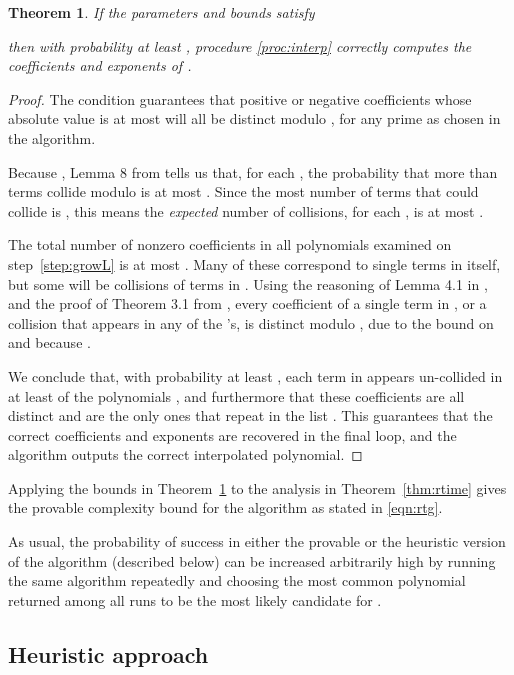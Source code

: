 \documentclass[letterpaper,10pt]{article}
\def\cite{\citep}
\newtheorem{theorem}{Theorem}
\begin{document}
\begin{theorem}\label{thm:bounds}
  If the parameters  and bounds  satisfy 
  
  then with
  probability at least , procedure \ref{proc:interp} correctly
  computes the coefficients and exponents of .
\end{theorem}
\begin{proof}
  The condition  guarantees that positive or negative
  coefficients whose absolute value is at most  will all be distinct
  modulo , for any prime  as chosen in the algorithm.

  Because , Lemma 8 from \cite{AGR13}
  tells us that, for each , the probability that more than 
  terms collide modulo  is at most .
  Since the most number of terms that could collide is , this means
  the \emph{expected} number of collisions, for each , is at
  most .

  The total number of nonzero coefficients in all polynomials  examined on
  step~\ref{step:growL} is at most . Many of
  these correspond to single terms in  itself, but some will be
  collisions of terms in . Using the reasoning of Lemma 4.1 in
  \cite{AGR14}, and the proof of Theorem 3.1 from \cite{GR11a},
  every coefficient of a single term in , or a collision that appears
  in any of the 's, is distinct modulo , due to the bound on
   and because .

  We conclude that, with probability at least , each term in 
  appears un-collided in at least  of the polynomials , and
  furthermore that these coefficients are all distinct and are the only
  ones that repeat in the list . This guarantees that the correct
  coefficients and exponents are recovered in the final loop, and the
  algorithm outputs the correct interpolated polynomial.
\end{proof}

Applying the bounds in Theorem~\ref{thm:bounds} to the analysis in
Theorem~\ref{thm:rtime} gives the provable complexity bound for the
algorithm as stated in \eqref{eqn:rtg}.

As usual, the probability of success in either the provable or the
heuristic version of the algorithm (described below)
can be increased arbitrarily high by
running the same algorithm repeatedly and choosing the most common
polynomial returned among all runs to be the most likely candidate for
.

\subsection{Heuristic approach}
\end{document}
